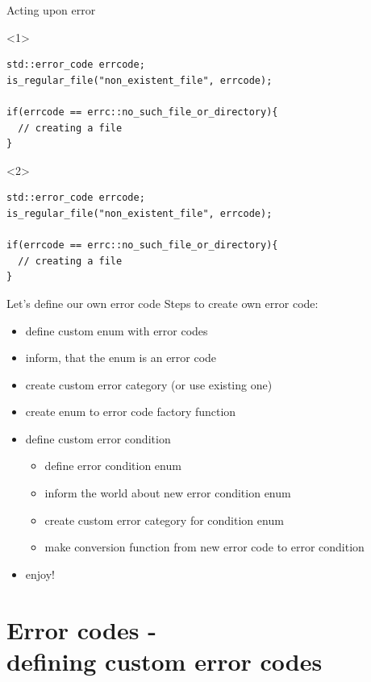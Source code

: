 \documentclass[10pt]{beamer}
\begin{document}
\begin{frame}[fragile]{Acting upon error}
	\begin{onlyenv}
	\begin{verbatim}
std::error_code errcode;
is_regular_file("non_existent_file", errcode);
  
if(errcode == errc::no_such_file_or_directory){
  // creating a file
}
	\end{verbatim}
	\end{onlyenv}

	\begin{onlyenv}
	\begin{verbatim}
std::error_code errcode;
is_regular_file("non_existent_file", errcode);
  
if(errcode == errc::no_such_file_or_directory){
  // creating a file
}
	\end{verbatim}
	\end{onlyenv}

\end{frame}

\begin{frame}{Let's define our own error code}
	Steps to create own error code:
	\begin{itemize}[<+- | alert@+>]
		\item define custom enum with error codes
		\item inform, that the enum is an error code
		\item create custom error category (or use existing one)
		\item create enum to error code factory function
		\item define custom error condition
		\begin{itemize}
			\item define error condition enum
			\item inform the world about new error condition enum
			\item create custom error category for condition enum
			\item make conversion function from new error code to error condition
		\end{itemize}
		\item enjoy!
	\end{itemize}
\end{frame}

\section{Error codes - \\ defining custom error codes}
\end{document}
